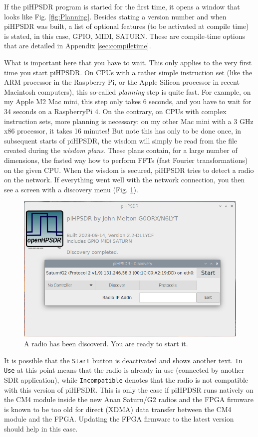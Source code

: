 \documentclass[12pt]{book}
\def\rett#1{\texttt{\color{red}#1}}
\begin{document}
If the piHPSDR program is started for the first time, it opens a window that looks like Fig. 
\ref{fig:Planning}. 
Besides stating a version number and when piHPSDR was built, a list of optional features (to be activated
at compile time) is stated, in this case, GPIO, MIDI, SATURN. These are compile-time options that are 
detailed in Appendix \ref{sec:compiletime}.

What is important here that you have to wait. This only applies to the very first time you start piHPSDR.
On CPUs with a rather simple instruction set (like the ARM processor in the Raspberry Pi, or the Apple
Silicon processor in recent Macintosh computers), this so-called  \textit{planning} step is quite fast. For 
example, on my
Apple M2 Mac mini, this step only takes 6 seconds, and you have to wait for 34 seconds on a RaspberryPi 4.
On the contrary, on CPUs with 
complex instruction sets, more planning is necessary: on my other Mac mini with a 3 GHz x86 processor, it
takes 16 minutes! But note
this has only to be done once, in subsequent starts of piHPSDR, the wisdom will simply be read from
the file created during the \textit{wisdom plans}. These plans contain, for a large number of dimensions, 
the fasted way how to perform FFTs (fast Fourier transformations) on the given CPU.
When the wisdom is secured, piHPSDR tries to detect a radio on the network. If everything went well with
the network connection, you then see a screen with a discovery menu (Fig. \ref{fig:Start}).

\begin{figure}
\center
\includegraphics[width=12cm]{Start.png}
\caption{A radio has been discoverd. You are ready  to start it.}
\label{fig:Start}
\end{figure}

It is possible that the \rett{Start} button is deactivated and shows another text. \rett{In Use} at
this point means that the radio is already in use (connected by another SDR application), while
\rett{Incompatible} denotes that the radio is not compatible with this version of piHPSDR. This
is only the case if piHPDSR runs natively on the CM4 module inside the new Anan Saturn/G2
radios and the FPGA firmware is known to be too old for direct (XDMA) data transfer between the CM4
module and the FPGA. Updating the FPGA firmware to the latest version
should help in this case.
\end{document}
